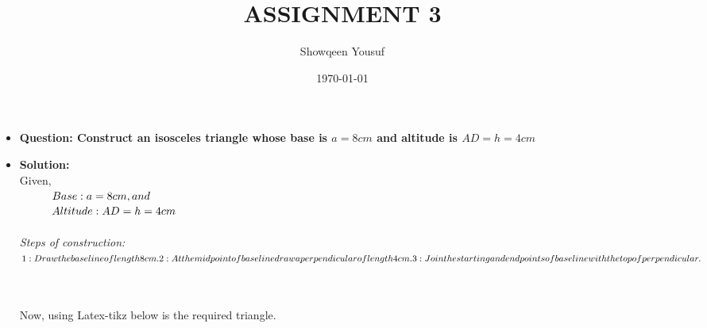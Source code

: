 \documentclass{article}
\begin{document}
\title{ASSIGNMENT 3}
\author{Showqeen Yousuf}
\date{\today}
\maketitle

\begin{itemize}
\item{\textbf{Question: Construct an isosceles triangle whose base is $a=8cm$ and altitude is $AD=h=4cm$}}\\

\item{\textbf{Solution:}}\\

Given,\\
$
\hspace{1 cm}Base: a=8cm, and\\
$\\
$
\hspace{1 cm}Altitude:AD=h=4cm\\
$\\
$
$\\
\textit{Steps of construction:}
$

1: Draw the base line of length 8 cm.\\

2: At the mid point of base line draw a perpendicular of length 4 cm.\\

3: Join the starting and end points of base line with the top of perpendicular.\\
$

\\
\\
Now, using Latex-tikz  below is the required triangle.
\begin{center}
\end{center}

\end{itemize}
\end{document}
